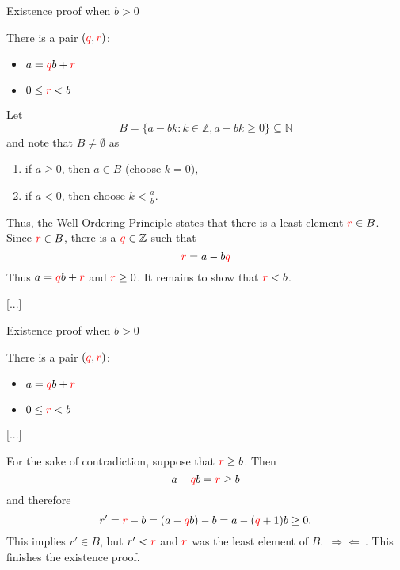 \documentclass{beamer}
\def\bl[#1]#2{\begin{block}{#1}#2\end{block}}
\def\enumb{\begin{enumerate}}
\def\enume{\end{enumerate}}
\def\itemb{\begin{itemize}}
\def\iteme{\end{itemize}}
\begin{document}
\begin{frame}{Existence proof when $b>0$}
\bl[]{
 There is a pair $(\color{red}q\color{black},\color{red}r\color{black})$:
\itemb
\item $a=\color{red}q\color{black}b+\color{red}r\color{black}$
\item $0\leq \color{red}r\color{black}<b$
\iteme }
Let
\[
B=\{a-bk: k\in\mathbb{Z}, a-bk\geq 0\}\subseteq \mathbb{N}
\]
and note that $B\neq\emptyset$ as
\enumb
\item if $a\geq 0$, then $a\in B$ (choose $k=0$),
\item if $a<0$, then choose $k<\frac{a}{b}$.
\enume
Thus, the Well-Ordering Principle states that there is a least element $\color{red}r\color{black}\in B$. Since $\color{red}r\color{black}\in B$, there is a $\color{red}q\color{black}\in\mathbb{Z}$ such that
\[
\color{red}r\color{black}=a-b\color{red}q\color{black}
\]
Thus $a=\color{red}q\color{black}b+\color{red}r\color{black}$ and $\color{red}r\color{black}\geq 0$. It remains to show that $\color{red}r\color{black}<b$. 

  [...]
\end{frame}

\begin{frame}
{Existence proof when $b>0$}
\bl[]{
 There is a pair $(\color{red}q\color{black},\color{red}r\color{black})$:
\itemb
\item $a=\color{red}q\color{black}b+\color{red}r\color{black}$
\item $0\leq \color{red}r\color{black}<b$
\iteme }
[...]

For the sake of contradiction, suppose that $\color{red}r\color{black}\geq b$. Then
\[
a-\color{red}q\color{black}b=\color{red}r\color{black}\geq b
\]
and therefore 
\[
r'=\color{red}r\color{black}-b=(a-\color{red}q\color{black}b)-b=a-(\color{red}q\color{black}+1)b\geq 0.
\]
This implies $r'\in B$, but $r'<\color{red}r\color{black}$ and $\color{red}r\color{black}$ was the least element of $B$.$~~\Rightarrow\Leftarrow~$. This finishes the existence proof.
\end{frame}
\end{document}

